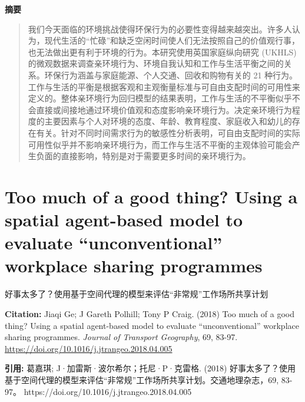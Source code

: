 \noindent\textbf{摘要}\par
\begin{quote}\small
我们今天面临的环境挑战使得环保行为的必要性变得越来越突出。许多人认为，现代生活的“忙碌”和缺乏空闲时间使人们无法按照自己的价值观行事，也无法做出更有利于环境的行为。本研究使用英国家庭纵向研究 (UKHLS) 的微观数据来调查亲环境行为、环境自我认知和工作与生活平衡之间的关系。环保行为涵盖与家庭能源、个人交通、回收和购物有关的 21 种行为。工作与生活的平衡是根据客观和主观衡量标准与可自由支配时间的可用性来定义的。整体亲环境行为回归模型的结果表明，工作与生活的不平衡似乎不会直接或间接地通过环境价值观和态度影响亲环境行为。决定亲环境行为程度的主要因素与个人对环境的态度、年龄、教育程度、家庭收入和幼儿的存在有关。针对不同时间需求行为的敏感性分析表明，可自由支配时间的实际可用性似乎并不影响亲环境行为，而工作与生活不平衡的主观体验可能会产生负面的直接影响，特别是对于需要更多时间的亲环境行为。
\end{quote}

\vspace{0.5em}
\chapter{Too much of a good thing? Using a spatial agent-based model to evaluate “unconventional” workplace sharing programmes}
\begin{center}\small 好事太多了？使用基于空间代理的模型来评估“非常规”工作场所共享计划\end{center}

\noindent\textbf{Citation:} Jiaqi Ge; J Gareth Polhill; Tony P Craig. (2018) Too much of a good thing? Using a spatial agent-based model to evaluate “unconventional” workplace sharing programmes. \textit{Journal of Transport Geography}, 69, 83-97. \url{https://doi.org/10.1016/j.jtrangeo.2018.04.005}

\vspace{0.5em}
\noindent\textbf{引用:} 葛嘉琪; J·加雷斯·波尔希尔；托尼·P·克雷格. (2018) 好事太多了？使用基于空间代理的模型来评估“非常规”工作场所共享计划。交通地理杂志，69, 83-97。 https://doi.org/10.1016/j.jtrangeo.2018.04.005

